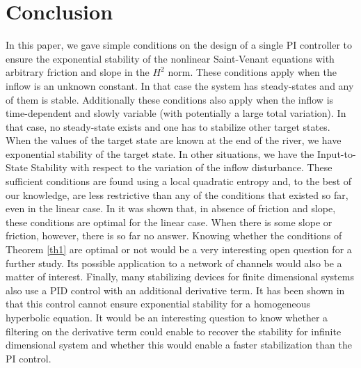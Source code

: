 \documentclass[11pt]{article}
\numberwithin{equation}{section}
\theoremstyle{definition}
\begin{document}
\section{Conclusion}
In this paper, we gave simple conditions on the design of a single PI controller to ensure
the exponential stability of the nonlinear Saint-Venant equations with arbitrary friction and slope in the $H^{2}$ norm.
These conditions apply when the inflow is an unknown constant{. I}n that case the system has steady-states and any of them is stable. {Additionally these conditions} also apply when
the inflow is time-dependent and slowly variable (with potentially a large total variation). In that case, no steady-state exists and one has to stabilize other target states.
When the values of the target state are known at the end of the river, we have exponential stability of the target state.
{In other situations}, we have the Input-to-State Stability with respect to the variation of the inflow disturbance.
These sufficient conditions are found using a local quadratic entropy
and, to the best of our knowledge, are less restrictive than any of the conditions that existed so far, even in the linear case.
In \cite{BastinCoronTamasoiu2015} it was shown that, in absence of friction and slope, these conditions {are} optimal for the linear case. When there is some slope or friction, however, there is so far no answer{. Knowing }whether the conditions of Theorem \ref{th1} are optimal or not would be a very interesting {open question} for a further study. {Its possible application to a network of channels would also be a matter of interest.
Finally, many stabilizing devices for finite dimensional systems also use a PID control with an additional derivative term.
It has been shown in \cite{CoronTamasoiu2015} that this control cannot ensure exponential stability for a homogeneous hyperbolic equation.
It would be an interesting question to know whether a filtering on the derivative term could enable to recover the stability for infinite dimensional system and whether this would enable a faster stabilization than the PI control.}

\appendix
\end{document}
